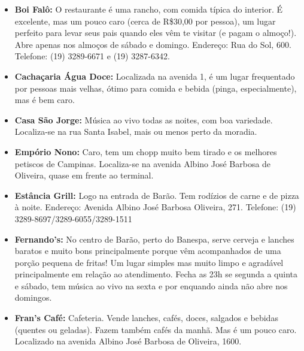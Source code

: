 \begin{itemize}
\item  \textbf{Boi Falô:} O restaurante é uma rancho, com comida típica do interior. É excelente, mas um pouco caro (cerca de R\$30,00 por pessoa), um lugar perfeito para levar seus pais quando eles vêm te visitar (e pagam o almoço!). Abre apenas nos almoços de sábado e domingo. Endereço: Rua do Sol, 600. Telefone: (19) 3289-6671 e (19) 3287-6342.
\end{itemize}

\begin{itemize}
\item  \textbf{Cachaçaria Água Doce:} Localizada na avenida 1, é um lugar frequentado por pessoas mais velhas, ótimo para comida e bebida (pinga, especialmente), mas é bem caro.
\end{itemize}

\begin{itemize}
\item  \textbf{Casa São Jorge:} Música ao vivo todas as noites, com boa variedade. Localiza-se na rua Santa Isabel, mais ou menos perto da moradia.
\end{itemize}

\begin{itemize}
\item  \textbf{Empório Nono:} Caro, tem um chopp muito bem tirado e os melhores petiscos de Campinas. Localiza-se na avenida Albino José Barbosa de Oliveira, quase em frente ao terminal.
\end{itemize}

\begin{itemize}
\item  \textbf{Estância Grill:} Logo na entrada de Barão. Tem rodízios de carne e de pizza à noite. Endereço: Avenida Albino José Barbosa Oliveira, 271. Telefone: (19) 3289-8697/3289-6055/3289-1511
\end{itemize}

\begin{itemize}
\item  \textbf{Fernando's:} No centro de Barão, perto do Banespa, serve cerveja e lanches baratos e muito bons principalmente porque vêm acompanhados de uma porção pequena de fritas! Um lugar simples mas muito limpo e agradável principalmente em relação ao atendimento. Fecha as 23h se segunda a quinta e sábado, tem música ao vivo na sexta e por enquando ainda não abre nos domingos.
\end{itemize}

\begin{itemize}
\item  \textbf{Fran's Café:} Cafeteria. Vende lanches, cafés, doces, salgados e bebidas (quentes ou geladas). Fazem também cafés da manhã. Mas é um pouco caro. Localizado na avenida Albino José Barbosa de Oliveira, 1600.
\end{itemize}

